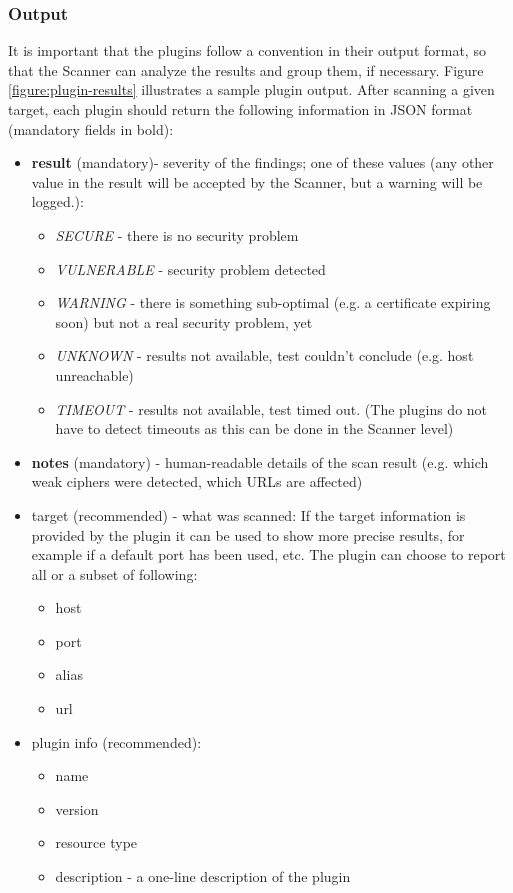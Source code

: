 \subsubsection{Output}
It is important that the plugins follow a convention in their output format, so that the Scanner can analyze the results and group them, if necessary. Figure \ref{figure:plugin-results} illustrates a sample plugin output. After scanning a given target, each plugin should return the following information in JSON format (mandatory fields in bold): 
\begin{itemize}


   \item \textbf{result} (mandatory)- severity of the findings; one of these values (any other value in the result will be accepted by the Scanner, but a warning will be logged.):
    \begin{itemize}
    

        \item \textit{SECURE} - there is no security problem
        \item  \textit{VULNERABLE} - security problem detected
        \item  \textit{WARNING} - there is something sub-optimal (e.g. a certificate expiring soon) but not a real security problem, yet
        \item  \textit{UNKNOWN} - results not available, test couldn't conclude (e.g. host unreachable)
        \item  \textit{TIMEOUT} - results not available, test timed out. (The plugins do not have to detect timeouts as this can be done in the Scanner level) 
            \end{itemize}
\item      \textbf{notes} (mandatory) - human-readable details of the scan result (e.g. which weak ciphers were detected, which URLs are affected)
\item      target (recommended) - what was scanned: If the target information is provided by the plugin it can be used to show more precise results, for example if a default port has been used, etc. The plugin can choose to report all or a subset of following:
\begin{itemize}


\item        host
\item    port
\item    alias
\item    url 
\end{itemize}
\item    plugin info (recommended):
\begin{itemize}
\item        name
\item        version
\item    resource type
\item    description - a one-line description of the plugin 
\end{itemize}
\end{itemize}



